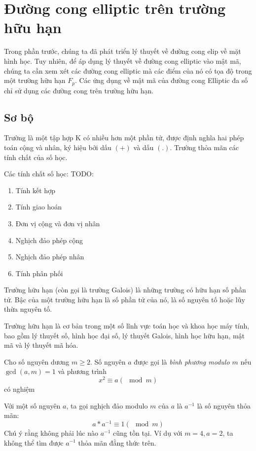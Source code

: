 \section{Đường cong elliptic trên trường hữu hạn}

Trong phần trước, chúng ta đã phát triển lý thuyết về đường cong elip về mặt hình học.
Tuy nhiên, để áp dụng lý thuyết về đường cong elliptic vào mật mã,
chúng ta cần xem xét các đường cong elliptic mà các điểm của nó có tọa độ trong một trường hữu hạn $F_p$.
Các ứng dụng về mật mã của đường cong Elliptic đa số chỉ sử dụng các đường
cong trên trường hữu hạn.

\subsection{Sơ bộ}
\begin{definition}
	Trường là một tập hợp K có nhiều hơn một phần tử, được định nghĩa hai phép toán cộng và nhân,
	ký hiệu bởi dấu $(+)$ và dấu $(.)$. Trường thỏa mãn các tính chất của số học.
\end{definition}
Các tính chất số học:
TODO:
\begin{enumerate}
	\item Tính kết hợp
	\item Tính giao hoán
	\item Đơn vị cộng và đơn vị nhân
	\item Nghịch đảo phép cộng
	\item Nghịch đảo phép nhân
	\item Tính phân phối
\end{enumerate}

\begin{definition}
	Trường hữu hạn (còn gọi là trường Galois) là những trường có hữu hạn số phần tử.
	Bậc của một trường hữu hạn là số phần tử của nó, là số nguyên tố hoặc lũy thừa nguyên tố.
\end{definition}
Trường hữu hạn là cơ bản trong một số lĩnh vực toán học và khoa học máy tính,
bao gồm lý thuyết số, hình học đại số, lý thuyết Galois, hình học hữu hạn, mật mã và lý thuyết mã hóa.

\begin{definition}
	Cho số nguyên dương $m \geq 2$. Số nguyên $a$ được gọi là \textit{bình phương modulo $m$} nếu $\gcd(a,m) = 1$ và phương trình
	$$x^2 \equiv a (\mod{m})$$
	có nghiệm
\end{definition}

\begin{definition}
	Với một số nguyên $a$, ta gọi nghịch đảo modulo $m$ của $a$ là $a^{-1}$ là số nguyên thỏa mãn:
	$$a * a^{-1} \equiv 1 (\mod{m})$$
	Chú ý rằng không phải lúc nào $a^{-1}$ cũng tồn tại. Ví dụ với $m = 4, a = 2$, ta không thể tìm được $a^{-1}$ thỏa mãn đằng thức trên.
\end{definition}

